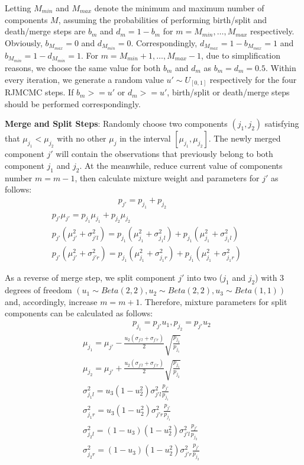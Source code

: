 \documentclass[conference]{IEEEtran}
\begin{document}
Letting $M_{min}$ and $M_{max}$ denote the minimum and maximum number of components $M$, assuming the probabilities of performing birth/split and death/merge steps are $b_m$ and $d_m = 1 - b_m$ for $m = M_{min},\dots,M_{max}$ respectively. Obviously, $b_{M_{max}}=0$ and $d_{M_{min}}=0$. Correspondingly, $d_{M_{max}}=1-b_{M_{max}} = 1$ and $b_{M_{min}}=1-d_{M_{min}}=1$. For $m=M_{min}+1,\dots,M_{max}-1$, due to simplification reasons, we choose the same value for both $b_m$ and $d_m$ as $b_m=d_m=0.5$. Within every iteration, we generate a random value $u' \sim U_{[0,1]}$ respectively for the four RJMCMC steps. If $b_m >= u'$ or $d_m >= u'$, birth/split or death/merge steps should be performed correspondingly.\cite{b1}

\textbf{Merge and Split Steps}: Randomly choose two components $(j_1,j_2)$ satisfying that $\mu_{j_1}<\mu_{j_2}$ with no other $\mu_j$ in the interval $[\mu_{j_1},\mu_{j_2}]$. The newly merged component $j'$ will contain the observations that previously belong to both component $j_1$ and $j_2$. At the meanwhile, reduce current value of components number $m=m-1$, then calculate mixture weight and parameters for $j'$ as follows:
\begin{multline}
\qquad\qquad\qquad\qquad p_{j'} = p_{j_1}+p_{j_2} \\
p_{j'}\mu_{j'} = p_{j_1}\mu_{j_1} + p_{j_2}\mu_{j_2} \\
p_{j'}(\mu_{j'}^2 + \sigma_{j'l}^2) = p_{j_1}(\mu_{j_1}^2 + \sigma_{j_1l}^2)+p_{j_1}(\mu_{j_1}^2 + \sigma_{j_1l}^2) \qquad \\
p_{j'}(\mu_{j'}^2 + \sigma_{j'r}^2) = p_{j_1}(\mu_{j_1}^2 + \sigma_{j_1r}^2)+p_{j_1}(\mu_{j_1}^2 + \sigma_{j_1r}^2)
\label{eq:merge}
\end{multline}

As a reverse of merge step, we split component $j'$ into two ($j_1$ and $j_2$) with 3 degrees of freedom $(u_1 \sim Beta(2,2), u_2 \sim Beta(2,2), u_3 \sim Beta(1,1))$ and, accordingly, increase $m=m+1$. Therefore, mixture parameters for split components can be calculated as follows:
\begin{multline}
\qquad\qquad\qquad p_{j_1} = p_{j'}u_1, p_{j_2} = p_{j'}u_2 \\
\mu_{j_1} = \mu_{j'} - \frac{u_2(\sigma_{j'l}+\sigma_{j'r})}{2} \sqrt{\frac{p_{j_2}}{p_{j_1}}} \\
\mu_{j_2} = \mu_{j'} + \frac{u_2(\sigma_{j'l}+\sigma_{j'r})}{2} \sqrt{\frac{p_{j_1}}{p_{j_2}}} \\
\sigma_{j_1l}^2 = u_3(1-u_2^2)\sigma_{j'l}^2\frac{p_{j'}}{p_{j_1}} \\
\sigma_{j_1r}^2 = u_3(1-u_2^2)\sigma_{j'r}^2\frac{p_{j'}}{p_{j_1}} \\
\sigma_{j_2l}^2 = (1-u_3)(1-u_2^2)\sigma_{j'l}^2\frac{p_{j'}}{p_{j_2}} \\
\sigma_{j_2r}^2 = (1-u_3)(1-u_2^2)\sigma_{j'r}^2\frac{p_{j'}}{p_{j_2}} \qquad\quad
\label{eq:split}
\end{multline}
\end{document}
